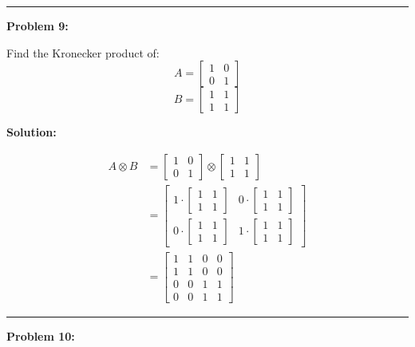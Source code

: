 \documentclass[
  letterpaper,
  DIV=11,
  numbers=noendperiod]{scrreprt}
\theoremstyle{plain}
\theoremstyle{definition}
\theoremstyle{remark}
\begin{document}
\begin{center}\rule{0.5\linewidth}{0.5pt}\end{center}

\textbf{Problem 9:}

Find the Kronecker product of:
\[A=\begin{bmatrix}1&0\\0&1\end{bmatrix}\]
\[B=\begin{bmatrix}1&1\\1&1\end{bmatrix}\]

\textbf{Solution:}

\begin{align*}
A \otimes B &= \begin{bmatrix}1&0\\0&1\end{bmatrix} \otimes \begin{bmatrix}1&1\\1&1\end{bmatrix} \\
&= \begin{bmatrix}
1 \cdot \begin{bmatrix}1&1\\1&1\end{bmatrix} & 0 \cdot \begin{bmatrix}1&1\\1&1\end{bmatrix} \\
0 \cdot \begin{bmatrix}1&1\\1&1\end{bmatrix} & 1 \cdot \begin{bmatrix}1&1\\1&1\end{bmatrix}
\end{bmatrix} \\
&= \begin{bmatrix}
1 & 1 & 0 & 0 \\
1 & 1 & 0 & 0 \\
0 & 0 & 1 & 1 \\
0 & 0 & 1 & 1
\end{bmatrix}
\end{align*}

\begin{center}\rule{0.5\linewidth}{0.5pt}\end{center}

\textbf{Problem 10:}
\end{document}

